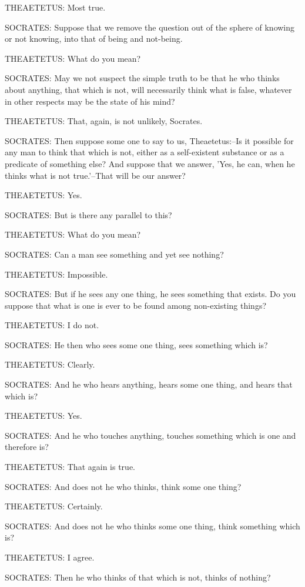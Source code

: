 THEAETETUS: Most true.

SOCRATES: Suppose that we remove the question out of the sphere of
knowing or not knowing, into that of being and not-being.

THEAETETUS: What do you mean?

SOCRATES: May we not suspect the simple truth to be that he who thinks
about anything, that which is not, will necessarily think what is false,
whatever in other respects may be the state of his mind?

THEAETETUS: That, again, is not unlikely, Socrates.

SOCRATES: Then suppose some one to say to us, Theaetetus:--Is
it possible for any man to think that which is not, either as a
self-existent substance or as a predicate of something else? And suppose
that we answer, 'Yes, he can, when he thinks what is not true.'--That
will be our answer?

THEAETETUS: Yes.

SOCRATES: But is there any parallel to this?

THEAETETUS: What do you mean?

SOCRATES: Can a man see something and yet see nothing?

THEAETETUS: Impossible.

SOCRATES: But if he sees any one thing, he sees something that exists.
Do you suppose that what is one is ever to be found among non-existing
things?

THEAETETUS: I do not.

SOCRATES: He then who sees some one thing, sees something which is?

THEAETETUS: Clearly.

SOCRATES: And he who hears anything, hears some one thing, and hears
that which is?

THEAETETUS: Yes.

SOCRATES: And he who touches anything, touches something which is one
and therefore is?

THEAETETUS: That again is true.

SOCRATES: And does not he who thinks, think some one thing?

THEAETETUS: Certainly.

SOCRATES: And does not he who thinks some one thing, think something
which is?

THEAETETUS: I agree.

SOCRATES: Then he who thinks of that which is not, thinks of nothing?

